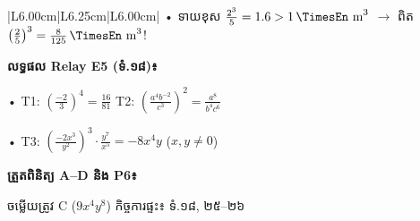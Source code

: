 \documentclass[a4paper,10pt]{article}
\newcommand{\en}[1]{{\TimesEn #1}}
\newcommand{\unit}[1]{\,\text{\en{#1}}}
\begin{document}
{\begin{tabular}{|L{6.00cm}|L{6.25cm}|L{6.00cm}|}
• ទាយខុស $\frac{2^3}{5}=1.6>1\unit{m}^3$ $\to$ ពិត $\left(\frac{2}{5}\right)^3 = \frac{8}{125}\unit{m}^3$!\par
\textbf{លទ្ធផល \en{Relay E5} (ទំ.១៨)៖}\par
• \en{T1:} $\left(\frac{-2}{3}\right)^4=\frac{16}{81}$ \textbar{} \en{T2:} $\left(\frac{a^4b^{-2}}{c^3}\right)^2=\frac{a^8}{b^4c^6}$\par
• \en{T3:} $\left(\frac{-2x^3}{y^2}\right)^3\cdot\frac{y^7}{x^5} = -8x^4y$ ($x,y\neq 0$)\par
\textbf{ត្រួតពិនិត្យ \en{A--D} និង \en{P6}៖}\par
ចម្លើយត្រូវ \en{C} ($9x^4y^8$) \textbar{} កិច្ចការផ្ទះ៖ ទំ.១៨, ២៥–២៦ \\
\hline
\end{tabular}}
\end{document}
